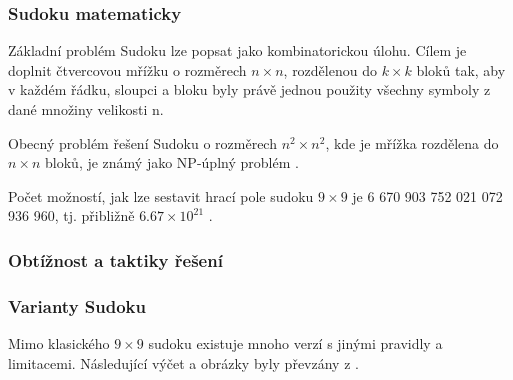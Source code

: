 \documentclass[
  master,
  program=ainfvs,
  biblatex,
  figures=true,
  tables=false,
  sourcecodes,
  glossaries,
  index
]{kidiplom}
\begin{document}
\subsubsection{Sudoku matematicky}

Základní problém Sudoku lze popsat jako kombinatorickou úlohu. Cílem je doplnit čtvercovou mřížku o rozměrech $n \times n$, rozdělenou do $k \times k$ bloků tak, aby v každém řádku, sloupci a bloku byly právě jednou použity všechny symboly z dané množiny velikosti n.

Obecný problém řešení Sudoku o rozměrech $n^2 \times n^2$, kde je mřížka rozdělena do $n \times n$ bloků, je známý jako NP-úplný problém \cite{Yato2003}.

Počet možností, jak lze sestavit hrací pole sudoku $9 \times 9$ je 6 670 903 752 021 072 936 960, tj. přibližně  $6.67 \times 10^{21}$ \cite{Felgenhauer2005}.

\subsubsection{Obtížnost a taktiky řešení}
\label{tacticsSubsection}

\subsubsection{Varianty Sudoku}

Mimo klasického $9 \times 9$ sudoku existuje mnoho verzí s jinými pravidly a limitacemi. Následující výčet a obrázky byly převzány z \cite{sudoku-puzzles.net}.
\end{document}
